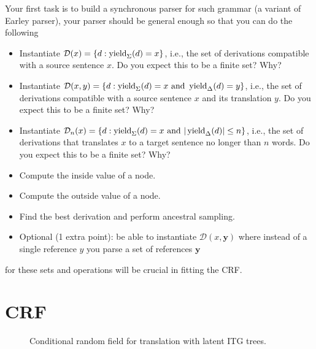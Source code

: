 Your first task is to build a synchronous parser for such grammar (a variant of Earley parser), your parser should be general enough so that you can do the following
\begin{itemize}
	\item Instantiate $\mathcal D( x) = \{ d: \operatorname{yield}_\Sigma( d) =  x\}$, i.e., the set of derivations compatible with a source sentence $x$. Do you expect this to be a finite set? Why?
	\item Instantiate $\mathcal D( x,  y) = \{ d: \operatorname{yield}_\Sigma( d) =  x \text{ and } \operatorname{yield}_\Delta( d) =  y\}$, i.e., the set of derivations compatible with a source sentence $ x$ and its translation $ y$. Do you expect this to be a finite set? Why?
	\item Instantiate $\mathcal D_n( x) = \{ d: \operatorname{yield}_\Sigma( d) =  x \text{ and } |\operatorname{yield}_\Delta(d)| \le n\}$, i.e., the set of derivations that translates $x$ to a target sentence no longer than $n$ words. Do you expect this to be a finite set? Why?
	 \item Compute the inside value of a node.
	 \item Compute the outside value of a node.
	 \item Find the best derivation and perform ancestral sampling.
	 \item Optional (1 extra point): be able to instantiate $\mathcal D( x,  \mathbf y)$ where instead of a single reference $y$ you parse a set of references $\mathbf y$
\end{itemize}
for these sets and operations will be crucial in fitting the CRF.

\section{CRF}

\begin{center}
\begin{figure}[h]\centering
\caption{Conditional random field for translation with latent ITG trees.}
\end{figure}
\end{center}



